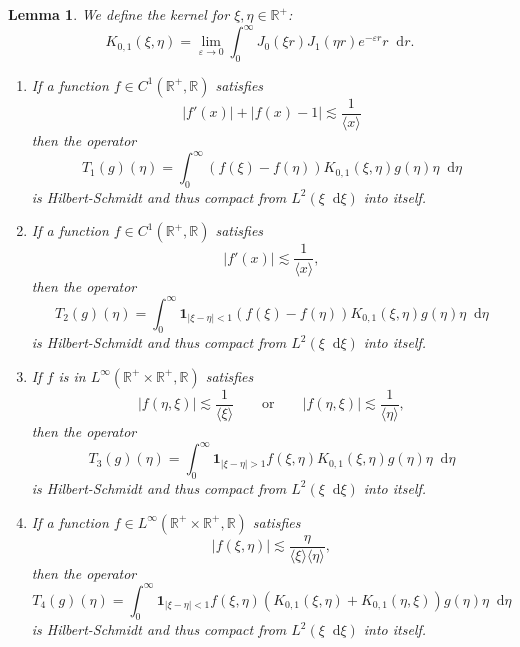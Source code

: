 \documentclass[11 pt]{amsart}
\newtheorem{lem}{Lemma}[section]
\theoremstyle{definition}
\theoremstyle{remark}
\numberwithin{equation}{section}
\newcommand{\dd}{\mathop{}\!\mathrm{d}}
\begin{document}
\begin{lem}
  \label{supersonic}We define the kernel for $\xi, \eta \in \mathbb{R}^+$:
  \[ K_{0, 1} (\xi, \eta) = \lim_{\varepsilon \rightarrow 0} \int_0^\infty
     J_0 (\xi r) J_1 (\eta r) e^{- \varepsilon r} r \dd r. \]
  
\begin{enumerate}
\item If a function $f \in C^1 (\mathbb{R}^+, \mathbb{R})$ satisfies
  \[ | f' (x) | + | f (x) - 1 | \lesssim \frac{1}{\langle x \rangle} \]
then the operator
  \[ T_1 (g) (\eta) = \int_0^\infty (f (\xi) - f (\eta)) K_{0, 1} (\xi,
     \eta) g (\eta) \eta \dd \eta \]
  is Hilbert-Schmidt and thus compact from $L^2 (\xi \dd \xi)$ into
  itself.

\smallskip

\item If a function $f \in C^1 (\mathbb{R}^+, \mathbb{R})$ satisfies
$$
|f'(x)| \lesssim \frac{1}{\langle x \rangle},
$$
then the operator
$$
T_2 (g) (\eta) = \int_0^\infty \mathbf{1}_{|\xi-\eta| < 1} (f (\xi) - f (\eta)) K_{0, 1} (\xi,
     \eta) g (\eta) \eta \dd \eta
$$
is Hilbert-Schmidt and thus compact from $L^2 (\xi \dd \xi)$ into itself.

\medskip

\item If $f$ is in $L^\infty(\mathbb{R}^+ \times \mathbb{R}^+,
  \mathbb{R})$ satisfies
$$
|f(\eta,\xi)| \lesssim \frac{1}{\langle \xi \rangle} \qquad \mbox{or} \qquad |f(\eta,\xi)| \lesssim \frac{1}{\langle \eta \rangle},
$$
then the operator
$$
T_3 (g) (\eta) = \int_0^\infty \mathbf{1}_{|\xi-\eta| > 1} f (\xi, \eta) K_{0, 1} (\xi, \eta)  g (\eta) \eta \dd \eta
$$
is Hilbert-Schmidt and thus compact from $L^2 (\xi \dd \xi)$ into itself.

\smallskip
\item If a function $f \in L^{\infty} (\mathbb{R}^+ \times \mathbb{R}^+,
  \mathbb{R})$ satisfies
  \[ | f (\xi, \eta) | \lesssim \frac{\eta}{\langle
     \xi \rangle \langle \eta \rangle}, \]
then the operator
  \[ T_4 (g) (\eta) = \int_0^\infty \mathbf{1}_{|\xi-\eta| < 1} f (\xi, \eta) (K_{0, 1} (\xi, \eta) +
     K_{0, 1} (\eta, \xi)) g (\eta) \eta \dd \eta \]
  is Hilbert-Schmidt and thus compact from $L^2 (\xi \dd \xi)$ into
  itself.
\end{enumerate}
\end{lem}
\end{document}
